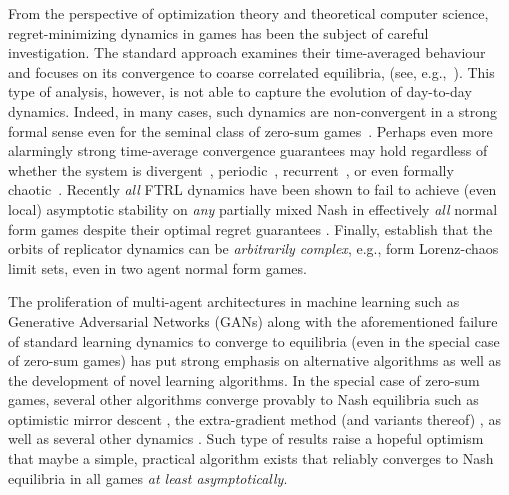 \documentclass[11pt]{article}
\begin{document}
From the perspective of optimization theory and theoretical computer science,  regret-minimizing dynamics in games has been the subject of careful investigation.
The standard approach examines their time-averaged behaviour and focuses on its convergence to coarse correlated equilibria, (see, e.g.,~\citep{roughgarden2015intrinsic,stoltz2007learning}).
This type of analysis, however, is not able to capture the evolution of day-to-day dynamics.
Indeed, in many cases, such dynamics are non-convergent in a strong formal sense even for the seminal class of zero-sum games~\citep{piliouras2014optimization,mertikopoulos2018cycles,bailey2019multi,BaileyEC18}.
Perhaps even more alarmingly strong time-average convergence guarantees may hold regardless of whether the system is divergent~\citep{BaileyEC18}, periodic~\citep{boone2019darwin}, recurrent~\citep{bailey2020finite}, or even formally chaotic~\citep{palaiopanos2017multiplicative,CFMP2019,cheung2019vortices,cheung2020chaos,bielawski2021follow,kuen2021chaos}. Recently \textit{all}  FTRL dynamics have been shown to fail to achieve (even local) asymptotic stability on \textit{any} partially mixed Nash in effectively \textit{all} normal form games despite their optimal regret guarantees \citep{flokas2020no,pmlr-v134-giannou21a}. Finally, \citet{andrade21} establish that the orbits of replicator dynamics can be \textit{arbitrarily complex}, e.g., form Lorenz-chaos limit sets, even in two agent normal form games.



The proliferation of multi-agent architectures in machine learning such as  Generative Adversarial Networks (GANs) along with the aforementioned failure of standard learning dynamics to converge to  equilibria (even in the special case of zero-sum games)
has put strong emphasis on alternative algorithms as well as the development of novel learning algorithms. In the special case of zero-sum games, several other algorithms  converge provably to Nash equilibria such as optimistic mirror descent \citep{rakhlin2013optimization,daskalakis2018training,daskalakis2018last}, the extra-gradient method (and variants thereof) \citep{korpelevich1976extragradient,gidel2019a,mertikopoulos2019optimistic}, as well as several other dynamics \citep{gidel2019negative,letcher2019differentiable,perolat2021poincare}. Such type of results raise a hopeful optimism that maybe a simple, practical algorithm exists that reliably converges to Nash equilibria in all games \textit{at least asymptotically}. 
\end{document}
